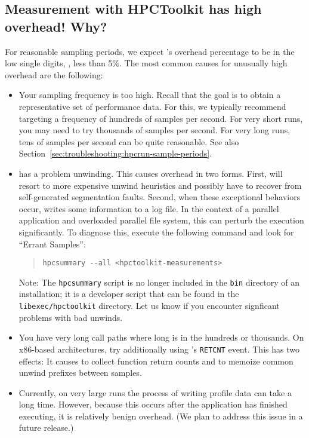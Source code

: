 \documentclass[11pt,twoside,letterpaper]{report}
\begin{document}
\subsection{Measurement with HPCToolkit has high overhead! Why?}

For reasonable sampling periods, we expect \hpcrun{}'s overhead percentage to be in the low single digits, \eg{}, less than 5\%.
The most common causes for unusually high overhead are the following:
\begin{itemize}

\item Your sampling frequency is too high.
  Recall that the goal is to obtain a representative set of performance data.
  For this, we typically recommend targeting a frequency of hundreds of samples per second.
  For very short runs, you may need to try thousands of samples per second.
  For very long runs, tens of samples per second can be quite reasonable.
  See also Section~\ref{sec:troubleshooting:hpcrun-sample-periods}.

\item \hpcrun{} has a problem unwinding.
  This causes overhead in two forms.
  First, \hpcrun{} will resort to more expensive unwind heuristics and possibly have to recover from self-generated segmentation faults.
  Second, when these exceptional behaviors occur, \hpcrun{} writes some information to a log file.
  In the context of a parallel application and overloaded parallel file system, this can perturb the execution significantly.
  To diagnose this, execute the following command and look for ``Errant Samples'':
  \begin{quote}
  \verb|hpcsummary --all <hpctoolkit-measurements>|
  \end{quote}
  Note: The \verb|hpcsummary| script is no longer included in the \verb|bin| directory of an \HPCToolkit{} installation;
  it is a developer script that can be found in the \verb|libexec/hpctoolkit| directory.
  Let us know if you encounter signficant problems with bad unwinds.

\item You have very long call paths where long is in the hundreds or thousands.
  On x86-based architectures, try additionally using \hpcrun{}'s \texttt{RETCNT} event.
  This has two effects: It causes \hpcrun{} to collect function return counts and to memoize common unwind prefixes between samples.

\item Currently, on very large runs the process of writing profile data can take a long time.
  However, because this occurs after the application has finished executing, it is relatively benign overhead.
  (We plan to address this issue in a future release.)

\end{itemize}
\end{document}
